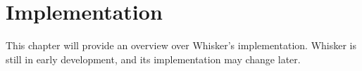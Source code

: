 







\chapter{Implementation}
\label{cha:implementation}

This chapter will provide an overview over Whisker's implementation.
Whisker is still in early development, and its implementation may change later.

%
%

